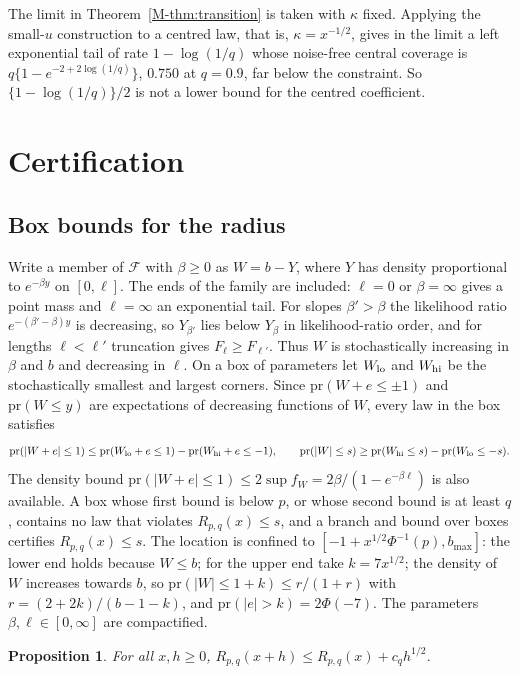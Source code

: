 \documentclass[11pt]{article}
\newtheorem{proposition}{Proposition}
\newcommand{\pr}{\mathrm{pr}}
\begin{document}
The limit in Theorem~\ref{M-thm:transition} is taken with $\kappa$ fixed. Applying the small-$u$ construction to a centred law, that is, $\kappa = x^{-1/2}$, gives in the limit a left exponential tail of rate $1 - \log(1/q)$ whose noise-free central coverage is $q\{1 - e^{-2 + 2\log(1/q)}\}$, $0.750$ at $q = 0.9$, far below the constraint. So $\{1 - \log(1/q)\}/2$ is not a lower bound for the centred coefficient.

\section{Certification}\label{sec:s-cert}

\subsection*{Box bounds for the radius}

Write a member of $\mathcal F$ with $\beta \ge 0$ as $W = b - Y$, where $Y$ has density proportional to $e^{-\beta y}$ on $[0,\ell]$. The ends of the family are included: $\ell = 0$ or $\beta = \infty$ gives a point mass and $\ell = \infty$ an exponential tail. For slopes $\beta' > \beta$ the likelihood ratio $e^{-(\beta'-\beta)y}$ is decreasing, so $Y_{\beta'}$ lies below $Y_\beta$ in likelihood-ratio order, and for lengths $\ell < \ell'$ truncation gives $F_\ell \ge F_{\ell'}$. Thus $W$ is stochastically increasing in $\beta$ and $b$ and decreasing in $\ell$. On a box of parameters let $W_{\rm lo}$ and $W_{\rm hi}$ be the stochastically smallest and largest corners. Since $\pr(W + e \le \pm 1)$ and $\pr(W \le y)$ are expectations of decreasing functions of $W$, every law in the box satisfies
\[
\pr(|W+e| \le 1) \le \pr(W_{\rm lo} + e \le 1) - \pr(W_{\rm hi} + e \le -1),\qquad \pr(|W| \le s) \ge \pr(W_{\rm hi} \le s) - \pr(W_{\rm lo} \le -s).
\]
The density bound $\pr(|W+e| \le 1) \le 2\sup f_W = 2\beta/(1 - e^{-\beta\ell})$ is also available. A box whose first bound is below $p$, or whose second bound is at least $q$, contains no law that violates $R_{p,q}(x) \le s$, and a branch and bound over boxes certifies $R_{p,q}(x) \le s$. The location is confined to $[-1 + x^{1/2}\Phi^{-1}(p), b_{\max}]$: the lower end holds because $W \le b$; for the upper end take $k = 7x^{1/2}$; the density of $W$ increases towards $b$, so $\pr(|W| \le 1+k) \le r/(1+r)$ with $r = (2+2k)/(b-1-k)$, and $\pr(|e| > k) = 2\Phi(-7)$. The parameters $\beta, \ell \in [0,\infty]$ are compactified.

\begin{proposition}\label{prop:continuity}
For all $x, h \ge 0$, $R_{p,q}(x + h) \le R_{p,q}(x) + c_q h^{1/2}$.
\end{proposition}
\end{document}
